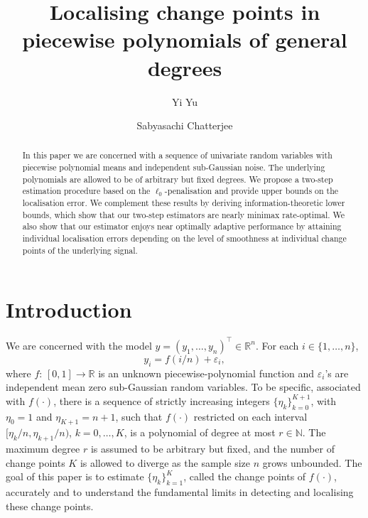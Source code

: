 \documentclass{article}
\title{Localising change points in \\piecewise polynomials of general degrees}
\author[1]{Yi Yu}
\author[2]{Sabyasachi Chatterjee}
\affil[1]{Department of Statistics, University of Warwick}
\affil[2]{Department of Statistics, University of Illinois Urbana-Champaign}
\begin{document}
	
\maketitle

\begin{abstract}
In this paper we are concerned with a sequence of univariate random variables with piecewise polynomial means and independent sub-Gaussian noise.  The underlying polynomials are allowed to be of arbitrary but fixed degrees.  We propose a two-step estimation procedure based on the $\ell_0$-penalisation and provide upper bounds on the localisation error.  We complement these results by deriving information-theoretic lower bounds, which show that our two-step estimators are nearly minimax rate-optimal.  We also show that our estimator enjoys near optimally adaptive performance by attaining individual localisation errors depending on the level of smoothness at individual change points of the underlying signal.
\end{abstract}

\section{Introduction}

We are concerned with the model $y = (y_1, \ldots, y_n)^{\top} \in \mathbb{R}^n$.  For each $i \in \{1, \ldots, n\}$,
	\begin{equation}\label{eq-y-intro}
		y_i = f(i/n) + \varepsilon_i, 
	\end{equation}
	where $f:\, [0, 1] \to \mathbb{R}$ is an unknown piecewise-polynomial function and $\varepsilon_i$'s are independent mean zero sub-Gaussian random variables.  To be specific, associated with $f(\cdot)$, there is a sequence of strictly increasing integers $\{\eta_k\}_{k = 0}^{K+1}$, with $\eta_0 = 1$ and $\eta_{K+1} = n+1$, such that $f(\cdot)$ restricted on each interval $[\eta_k/n, \eta_{k+1}/n)$, $k = 0, \ldots, K$, is a polynomial of degree at most $r \in \mathbb{N}$.	The maximum degree $r$ is assumed to be arbitrary but fixed, and the number of change points $K$ is allowed to diverge as the sample size $n$ grows unbounded.  The goal of this paper is to estimate $\{\eta_k\}_{k = 1}^K$, called the change points of $f(\cdot)$, accurately and to understand the fundamental limits in detecting and localising these change points.	
\end{document}
